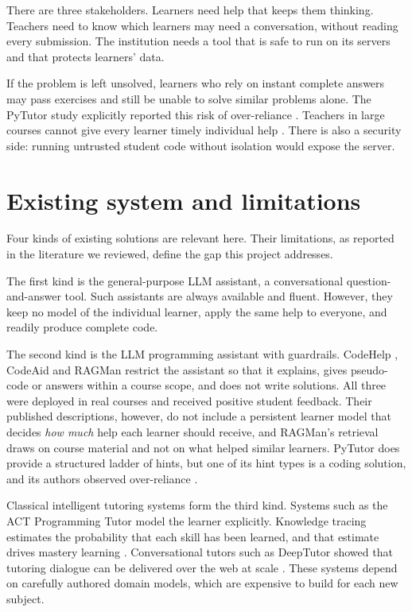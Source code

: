 There are three stakeholders. Learners need help that keeps them thinking. Teachers need to know which learners may need a conversation, without reading every submission. The institution needs a tool that is safe to run on its servers and that protects learners' data.

If the problem is left unsolved, learners who rely on instant complete answers may pass exercises and still be unable to solve similar problems alone. The PyTutor study explicitly reported this risk of over-reliance \cite{yang2024}. Teachers in large courses cannot give every learner timely individual help \cite{liffiton2023}. There is also a security side: running untrusted student code without isolation would expose the server.

\section{Existing system and limitations}
Four kinds of existing solutions are relevant here. Their limitations, as reported in the literature we reviewed, define the gap this project addresses.

The first kind is the general-purpose LLM assistant, a conversational question-and-answer tool. Such assistants are always available and fluent. However, they keep no model of the individual learner, apply the same help to everyone, and readily produce complete code.

The second kind is the LLM programming assistant with guardrails. CodeHelp \cite{liffiton2023}, CodeAid \cite{kazemitabaar2024} and RAGMan \cite{ma2024} restrict the assistant so that it explains, gives pseudo-code or answers within a course scope, and does not write solutions. All three were deployed in real courses and received positive student feedback. Their published descriptions, however, do not include a persistent learner model that decides \emph{how much} help each learner should receive, and RAGMan's retrieval draws on course material and not on what helped similar learners. PyTutor does provide a structured ladder of hints, but one of its hint types is a coding solution, and its authors observed over-reliance \cite{yang2024}.

Classical intelligent tutoring systems form the third kind. Systems such as the ACT Programming Tutor model the learner explicitly. Knowledge tracing estimates the probability that each skill has been learned, and that estimate drives mastery learning \cite{corbett1995}. Conversational tutors such as DeepTutor showed that tutoring dialogue can be delivered over the web at scale \cite{rus2015}. These systems depend on carefully authored domain models, which are expensive to build for each new subject.

